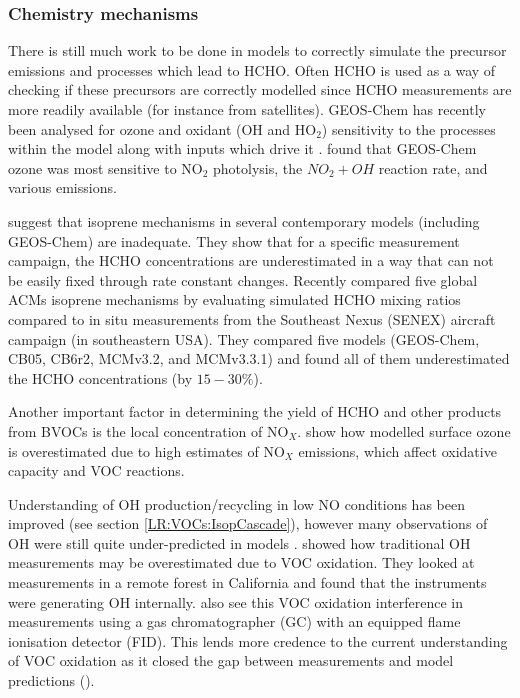     
    \subsubsection{Chemistry mechanisms}
      \label{LR:Models:Uncert:Chemistry}
      There is still much work to be done in models to correctly simulate the precursor emissions and processes which lead to HCHO.
      Often HCHO is used as a way of checking if these precursors are correctly modelled since HCHO measurements are more readily available (for instance from satellites).
      GEOS-Chem has recently been analysed for ozone and oxidant (OH and HO$_2$) sensitivity to the processes within the model along with inputs which drive it \citep{Christian2017}.
      \cite{Christian2017} found that GEOS-Chem ozone was most sensitive to NO$_2$ photolysis, the $NO_2 + OH$ reaction rate, and various emissions.

      \cite{Marvin2017} suggest that isoprene mechanisms in several contemporary models (including GEOS-Chem) are inadequate. 
      They show that for a specific measurement campaign, the HCHO concentrations are underestimated in a way that can not be easily fixed through rate constant changes.
      Recently \cite{Marvin2017} compared five global ACMs isoprene mechanisms by evaluating simulated HCHO mixing ratios compared to in situ measurements from the Southeast Nexus (SENEX) aircraft campaign (in southeastern USA).
      They compared five models (GEOS-Chem, CB05, CB6r2, MCMv3.2, and MCMv3.3.1) and found all of them underestimated the HCHO concentrations (by $15 - 30\%$).
      
      Another important factor in determining the yield of HCHO and other products from BVOCs is the local concentration of NO$_X$.
      \cite{Travis2016} show how modelled surface ozone is overestimated due to high estimates of NO$_X$ emissions, which affect oxidative capacity and VOC reactions.
      
      Understanding of OH production/recycling in low NO conditions has been improved (see section \ref{LR:VOCs:IsopCascade}), however many observations of OH were still quite under-predicted in models \citep{Mao2012}.
      \cite{Mao2012} showed how traditional OH measurements may be overestimated due to VOC oxidation.
      They looked at measurements in a remote forest in California and found that the instruments were generating OH internally.
      \cite{Nguyen2014} also see this VOC oxidation interference in measurements using a gas chromatographer (GC) with an equipped flame ionisation detector (FID).
      This lends more credence to the current understanding of VOC oxidation as it closed the gap between measurements and model predictions (\cite{Mao2012}).
    
